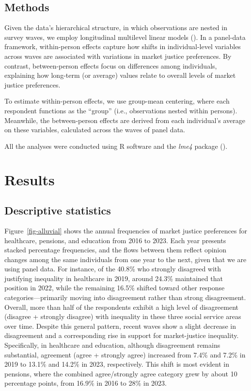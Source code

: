 \documentclass[
  12pt,
]{article}
\begin{document}
\subsection{Methods}\label{methods}

Given the data's hierarchical structure, in which observations are
nested in survey waves, we employ longitudinal multilevel linear models
(). In a
panel-data framework, within-person effects capture how shifts in
individual-level variables across waves are associated with variations
in market justice preferences. By contrast, between-person effects focus
on differences among individuals, explaining how long-term (or average)
values relate to overall levels of market justice preferences.

To estimate within-person effects, we use group-mean centering, where
each respondent functions as the ``group'' (i.e., observations nested
within persons). Meanwhile, the between-person effects are derived from
each individual's average on these variables, calculated across the
waves of panel data.

All the analyses were conducted using R software and the \emph{lme4}
package ().

\section{Results}\label{results}

\subsection{Descriptive statistics}\label{descriptive-statistics}

Figure~\ref{fig-alluvial} shows the annual frequencies of market justice
preferences for healthcare, pensions, and education from 2016 to 2023.
Each year presents stacked percentage frequencies, and the flows between
them reflect opinion changes among the same individuals from one year to
the next, given that we are using panel data. For instance, of the
40.8\% who strongly disagreed with justifying inequality in healthcare
in 2019, around 24.3\% maintained that position in 2022, while the
remaining 16.5\% shifted toward other response categories---primarily
moving into disagreement rather than strong disagreement. Overall, more
than half of the respondents exhibit a high level of disagreement
(disagree + strongly disagree) with inequality in these three social
service areas over time. Despite this general pattern, recent waves show
a slight decrease in disagreement and a corresponding rise in support
for market-justice inequality. Specifically, in healthcare and
education, although disagreement remains substantial, agreement (agree +
strongly agree) increased from 7.4\% and 7.2\% in 2019 to 13.1\% and
14.2\% in 2023, respectively. This shift is most evident in pensions,
where the combined agree/strongly agree category grew by about 10
percentage points, from 16.9\% in 2016 to 28\% in 2023.
\end{document}
